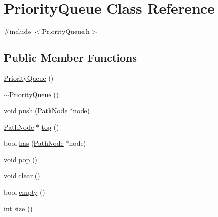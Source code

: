 \hypertarget{classPriorityQueue}{\section{Priority\-Queue Class Reference}
\label{classPriorityQueue}
}


{\ttfamily \#include $<$Priority\-Queue.\-h$>$}

\subsection*{Public Member Functions}
\begin{DoxyCompactItemize}
\item 
\hyperlink{classPriorityQueue_a43c56db471bb26fc2ae0f2ad90d81256}{Priority\-Queue} ()
\item 
\hyperlink{classPriorityQueue_a69b8f6b5ad108e9db66ac4db46c628d7}{$\sim$\-Priority\-Queue} ()
\item 
void \hyperlink{classPriorityQueue_ac4b66b5e38519272280b7c642b6e33cd}{push} (\hyperlink{structPathNode}{Path\-Node} $\ast$node)
\item 
\hyperlink{structPathNode}{Path\-Node} $\ast$ \hyperlink{classPriorityQueue_a6a32975106abaadce005966e21fa088d}{top} ()
\item 
bool \hyperlink{classPriorityQueue_ad3a482624abc3d4a87f74b1404ff201a}{has} (\hyperlink{structPathNode}{Path\-Node} $\ast$node)
\item 
void \hyperlink{classPriorityQueue_a9395579e928d279a1fc7c9302a130a29}{pop} ()
\item 
void \hyperlink{classPriorityQueue_a1d25b05db6d11496d3923fbf0d5d9acd}{clear} ()
\item 
bool \hyperlink{classPriorityQueue_a39f863f0a358df2a14a6388f3e347010}{empty} ()
\item 
int \hyperlink{classPriorityQueue_a9e739f490c722aa98a7d7560d46b8a51}{size} ()
\end{DoxyCompactItemize}


